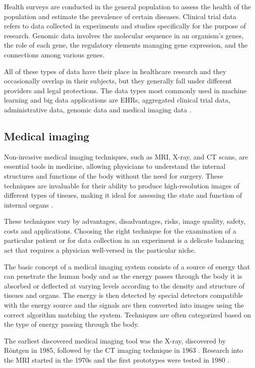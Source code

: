 	Health surveys are conducted in the general population to assess the health of the population and estimate the prevalence of certain diseases. Clinical trial data refers to data collected in experiments and studies specifically for the purpose of research. Genomic data involves the molecular sequence in an organism’s genes, the role of each gene, the regulatory elements managing gene expression, and the connections among various genes.
	
	All of these types of data have their place in healthcare research and they occasionally overlap in their subjects, but they generally fall under different providers and legal protections. The data types most commonly used in machine learning and big data applications are EHRs, aggregated clinical trial data, administrative data, genomic data \cite{mostert2016big} and medical imaging data \cite{suzuki2017overview}.
	

	\subsection{Medical imaging}
	
	Non-invasive medical imaging techniques, such as MRI, X-ray, and CT scans, are essential tools in medicine, allowing physicians to understand the internal structures and functions of the body without the need for surgery. These techniques are invaluable for their ability to produce high-resolution images of different types of tissues, making it ideal for assessing the state and function of internal organs \cite{kasban2015comparative}.
	
	These techniques vary by advantages, disadvantages, risks, image quality, safety, costs and applications. Choosing the right technique for the examination of a particular patient or for data collection in an experiment is a delicate balancing act that requires a physician well-versed in the particular niche.
	
	The basic concept of a medical imaging system consists of a source of energy that can penetrate the human body and as the energy passes through the body it is absorbed or deflected at varying levels according to the density and structure of tissues and organs. The energy is then detected by special detectors compatible with the energy source and the signals are then converted into images using the correct algorithm matching the system. Techniques are often categorized based on the type of energy passing through the body.
	
	The earliest discovered medical imaging tool was the X-ray, discovered by Röntgen in 1985, followed by the CT imaging technique in 1963 \cite{kasban2015comparative}. Research into the MRI started in the 1970s and the first prototypes were tested in 1980 \cite{kasban2015comparative}.
	
